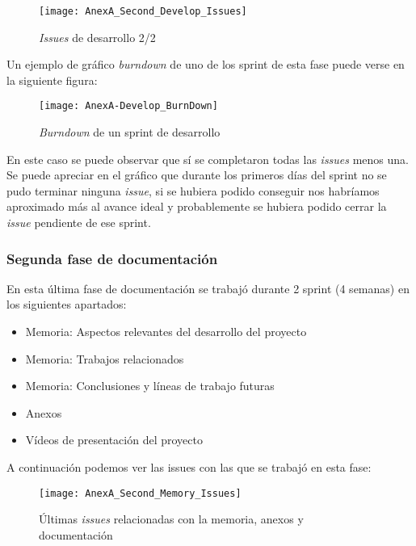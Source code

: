 \begin{figure}[!h]
	\centering
	\texttt{[image: AnexA\_Second\_Develop\_Issues]}
	\caption{\textit{Issues} de desarrollo 2/2}
	\label{fig:AnexA_Second_Develop_Issues}
\end{figure}
\FloatBarrier

Un ejemplo de gráfico \textit{burndown} de uno de los sprint de esta fase puede verse en la siguiente figura:

\begin{figure}[!h]
	\centering
	\texttt{[image: AnexA-Develop\_BurnDown]}
	\caption{\textit{Burndown} de un sprint de desarrollo}
	\label{fig:AnexA-Develop_BurnDown}
\end{figure}
\FloatBarrier

En este caso se puede observar que sí se completaron todas las \textit{issues} menos una. Se puede apreciar en el gráfico que durante los primeros días del sprint no se pudo terminar ninguna \textit{issue}, si se hubiera podido conseguir nos habríamos aproximado más al avance ideal y probablemente se hubiera podido cerrar la \textit{issue} pendiente de ese sprint.

\subsubsection{Segunda fase de documentación}
En esta última fase de documentación se trabajó durante 2 sprint (4 semanas) en los siguientes apartados:

\begin{itemize}
	\item Memoria: Aspectos relevantes del desarrollo del proyecto
	\item Memoria: Trabajos relacionados
	\item Memoria: Conclusiones y líneas de trabajo futuras
	\item Anexos
	\item Vídeos de presentación del proyecto
\end{itemize}

A continuación podemos ver las issues con las que se trabajó en esta fase:

\begin{figure}[!h]
	\centering
	\texttt{[image: AnexA\_Second\_Memory\_Issues]}
	\caption{Últimas \textit{issues} relacionadas con la memoria, anexos y documentación}
	\label{fig:AnexA_Second_Memory_Issues}
\end{figure}
\FloatBarrier

